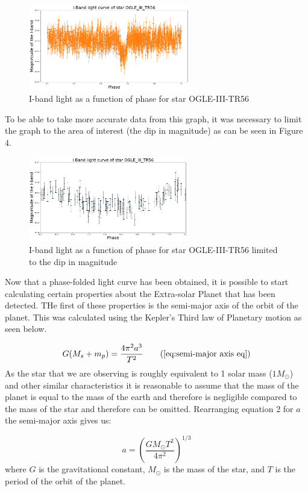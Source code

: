 \documentclass[]{article}
\begin{document}
\begin{figure}[h]
  \includegraphics[width=7cm]{images/I-band_curve.png}
  \caption{I-band light as a function of phase for star OGLE-III-TR56}
  \label{fig:HD-_init}
  \end{figure}
\newpage
To be able to take more accurate data from this graph, it
was necessary to limit the graph to the area of interest 
(the dip in magnitude) as can be seen in Figure 4.

\begin{figure}[h]
  \includegraphics[width=7cm]{images/I-band_limit.png}
  \caption{I-band light as a function of phase for star OGLE-III-TR56
  limited to the dip in magnitude}
  \label{fig:HD-_init}
  \end{figure}

Now that a phase-folded light curve has been obtained,
it is possible to start calculating certain properties
about the Extra-solar Planet that has been detected.
THe first of these properties is the semi-major axis
of the orbit of the planet. This was calculated using the 
Kepler's Third law of Planetary motion as seen below.

\begin{equation}
  G(M_s+m_p) = \frac{4\pi^2a^3}{T^2} \tag{\ref{eq:semi-major axis eq}}
  \end{equation}
As the star that we are observing is roughly equivalent to 1 
solar mass ($1M_\odot $) and other similar characteristics it is reasonable 
to assume that the mass of the planet is equal to 
the mass of the earth and therefore is negligible compared to 
the mass of the star and therefore can be omitted. 
Rearranging equation 2 for $a$ the semi-major axis
gives us:

\begin{equation}
  a = \left(\frac{GM_{\odot}T^2}{4\pi^2}\right)^{1/3}
  \end{equation}
where $G$ is the gravitational constant, $M_\odot$ is the mass of the star,
and $T$ is the period of the orbit of the planet.
\end{document}
